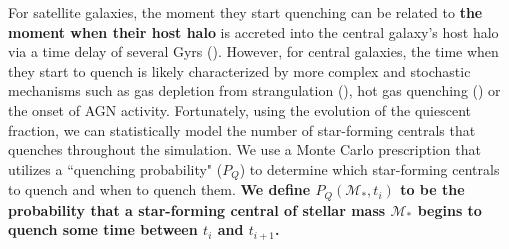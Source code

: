 \documentclass[iop,apj,tighten,twocolappendix,numberedappendix]{emulateapj}
\newcommand{\beq}{\begin{equation}}
\newcommand{\eeq}{\end{equation}}
\begin{document}
For satellite galaxies, the moment they start quenching can be
related to {\color{red} \bf the moment when their host halo} is accreted 
into the central galaxy's host halo via a time delay of 
several Gyrs (\citealt{Wetzel:2013aa}). 
However, for central galaxies, the time when they start to 
quench is likely characterized by more complex and stochastic 
mechanisms such as gas depletion from strangulation (\citealt{Peng:2015aa}), 
hot gas quenching (\citealt{Gabor:2010aa,Gabor:2012aa,Gabor:2015aa}) or 
the onset of AGN activity. Fortunately, using the evolution of the quiescent fraction, 
we can statistically model the number of star-forming centrals 
that quenches throughout the simulation. We use a Monte Carlo 
prescription that utilizes a ``quenching probability" ($P_Q$) 
to determine which star-forming centrals to quench and when to 
quench them. 
{\bf \color{dred}
We define $P_Q(\mathcal{M}_*, t_i)$ to be the probability that 
a star-forming central of stellar mass $\mathcal{M}_*$ begins 
to quench some time between $t_i$ and $t_{i+1}$. 
}
\end{document}
